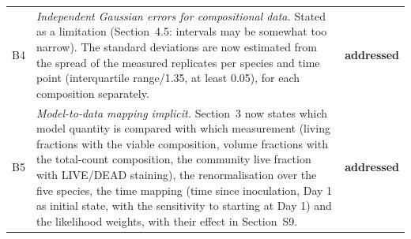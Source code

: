\documentclass[11pt,a4paper]{article}
\newcommand{\done}{\textcolor{green!45!black}{\textbf{addressed}}}
\begin{document}
\begin{tabularx}{\textwidth}{@{}l Y l@{}}
B4 & \emph{Independent Gaussian errors for compositional data.} Stated as a limitation (Section~4.5: intervals may be somewhat too narrow). The standard deviations are now estimated from the spread of the measured replicates per species and time point (interquartile range/1.35, at least 0.05), for each composition separately. & \done\\
B5 & \emph{Model-to-data mapping implicit.} Section~3 now states which model quantity is compared with which measurement (living fractions with the viable composition, volume fractions with the total-count composition, the community live fraction with LIVE/DEAD staining), the renormalisation over the five species, the time mapping (time since inoculation, Day 1 as initial state, with the sensitivity to starting at Day 1) and the likelihood weights, with their effect in Section~S9. & \done\\
\bottomrule
\end{tabularx}
\end{document}

